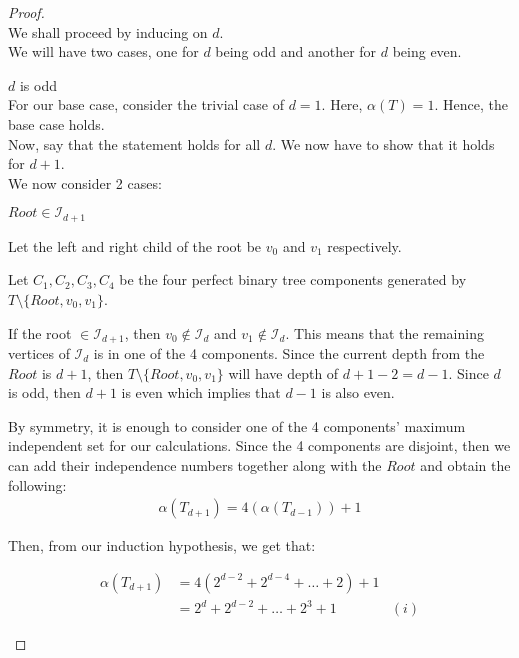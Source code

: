 \documentclass{article}
\theoremstyle{definition}
\begin{document}
\begin{proof}
	$ $ \\
	We shall proceed by inducing on $d$.\\
	We will have two cases, one for $d$ being odd and another for $d$ being even.
	\begin{caseof}
		\item $d$ is odd \\

		For our base case, consider the trivial case of $d = 1$. Here, $\alpha(T) = 1$. Hence, the base case holds. \\

		Now, say that the statement holds for all $d$. We now have to show that it holds for $d+1$. \\

		We now consider 2 cases:

		\begin{subcaseof}
			\item $Root \in \mathcal{I}_{d + 1}$

			Let the left and right child of the root be $v_0$ and $v_1$ respectively.

			Let $C_1, C_2, C_3, C_4$ be the four perfect binary tree components generated by $T \setminus \{Root, v_0, v_1\}$.

			If the root $\in \mathcal{I}_{d + 1}$, then $v_0 \not\in \mathcal{I}_d$ and $v_1 \not\in \mathcal{I}_d$. This means that the remaining vertices of $\mathcal{I}_d$ is in one of the 4 components.
			Since the current depth from the $Root$ is $d + 1$, then $T \setminus \{Root, v_0, v_1\}$ will have depth of $d + 1 - 2 = d - 1$. Since $d$ is odd, then $d + 1$ is even which implies that $d - 1$ is also even.

			By symmetry, it is enough to consider one of the 4 components' maximum independent set for our calculations. Since the 4 components are disjoint, then we can add their independence numbers together along with the $Root$ and obtain the following:
			\begin{align*}
				\alpha(T_{d + 1}) = 4(\alpha(T_{d - 1})) + 1
			\end{align*}

			Then, from our induction hypothesis, we get that:

			\begin{align*}
				\alpha(T_{d+1}) & = 4(2^{d - 2} + 2^{d - 4} + \ldots + 2) + 1                           \\
				                & = 2^d + 2^{d - 2} + \ldots + 2^3 + 1 \quad  & (i) \label{eq:odd_case}
			\end{align*}


\end{subcaseof}
\end{caseof}
\end{proof}
\end{document}

